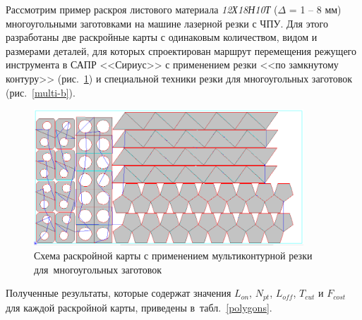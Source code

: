 \documentclass[11pt,twoside,openany]{report}
\begin{document}
Рассмотрим пример раскроя листового материала
{\it 12Х18Н10Т}
($\Delta$ = 1 -- 8 мм)
многоугольными заготовками на машине лазерной резки с ЧПУ.
Для этого разработаны две раскройные карты с одинаковым количеством,
видом и размерами деталей,
для которых спроектирован маршрут перемещения
режущего инструмента в САПР <<Сириус>> с
применением резки <<по замкнутому контуру>>
(рис.~\ref{multi-a})
и специальной техники резки для многоугольных заготовок
(рис.~\ref{multi-b}).

\begin{figure}[h]
  \begin{center}
  \includegraphics[width=0.9\textwidth]{multi-a.png}
  \caption{
    Схема раскройной карты
    с применением мультиконтурной резки
    для~многоугольных заготовок
    }
  \label{multi-a}
  \end{center}
\end{figure}

Полученные результаты, которые содержат значения
$L_{on}$, $N_{pt}$, $L_{off}$, $T_{cut}$ и $F_{cost}$
для каждой раскройной карты, приведены
в~табл.~\ref{polygons}.
\end{document}
